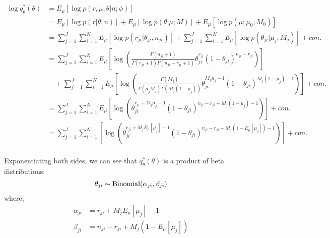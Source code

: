 \documentclass[11pt,reqno]{amsart}
\begin{document}
\begin{equation}
\begin{split}
\log q_\theta^*(\theta) &= E_\mu\left[ \log p\left(r,\mu,\theta | n; \phi \right) \right] \\
&= E_\mu \left[ \log p\left(r | \theta, n \right)\right] + E_\mu \left[ \log p\left(\theta | \mu; M \right)\right] + E_\mu \left[ \log p\left(\mu ; \mu_0, M_0 \right)\right] \\
&= \sum_{j=1}^{J} \sum_{i=1}^{N} E_\mu  \left[ \log p \left( r_{ji} | \theta_{ji}, n_{ji} \right) \right] + \sum_{j=1}^{J} \sum_{i=1}^{N} E_\mu \left[ \log p\left(\theta_{ji} | \mu_j; M_j \right)\right] +con. \\
&= \sum_{j=1}^{J} \sum_{i=1}^{N}  E_\mu  \left[ \log \left( \frac{ \Gamma(n_{ji}+1) } { \Gamma(r_{ji}+1) \Gamma( n_{ji} - r_{ji} + 1 ) } \theta_{ji}^{r_{ji}} (1 - \theta_{ji})^{n_{ji} - r_{ji}} \right) \right] \\
&\quad + \sum_{j=1}^{J} \sum_{i=1}^{N}  E_\mu  \left[ \log \left( \frac{ \Gamma(M_j) } { \Gamma(\mu_j M_j) \Gamma(M_j (1-\mu_j)) } \theta_{ji}^{M_j\mu_j -1} (1 - \theta_{ji})^{M_j ( 1 - \mu_j) - 1} \right) \right] +con.\\
&=  \sum_{j=1}^{J} \sum_{i=1}^{N} E_\mu\left[ \log \left( \theta_{ji}^{r_{ji} + M_j\mu_j -1} (1 - \theta_{ji})^{n_{ji} - r_{ji} + M_j ( 1 - \mu_j) - 1} \right) \right] +con. \\
&=   \sum_{j=1}^{J} \sum_{i=1}^{N} \left[ \log \left( \theta_{ji}^{r_{ji} + M_j E_\mu\left[ \mu_j\right] -1} (1 - \theta_{ji})^{n_{ji} - r_{ji} + M_j ( 1 - E_\mu\left[ \mu_j\right]) - 1} \right) \right] +con. \\
\end{split}
\end{equation}

Exponentiating both sides, we can see that  $ q_\theta^*(\theta) $ is a product of beta distributions:
\begin{align}
\theta_{ji} \thicksim \text{Binomial}(\alpha_{ji}, \beta_{ji})
\end{align}
where,
\begin{align}
\alpha_{ji} &= r_{ji} + M_j E_\mu\left[ \mu_j\right] -1 \nonumber \\
\beta_{ji} &= n_{ji} - r_{ji} + M_j ( 1 - E_\mu\left[ \mu_j\right]) \nonumber
\end{align}
\end{document}
